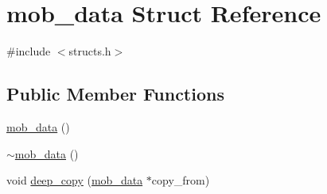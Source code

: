 \hypertarget{structmob__data}{\section{mob\-\_\-data Struct Reference}
\label{structmob__data}
}


{\ttfamily \#include $<$structs.\-h$>$}

\subsection*{Public Member Functions}
\begin{DoxyCompactItemize}
\item 
\hyperlink{structmob__data_afbc05dbae1398c3471a819f06c4aa904}{mob\-\_\-data} ()
\item 
\hyperlink{structmob__data_adc9bfc8556c0477389c0ec9a1e579055}{$\sim$mob\-\_\-data} ()
\item 
void \hyperlink{structmob__data_a9ba0ac10d57af36a05154c62fe3d5312}{deep\-\_\-copy} (\hyperlink{structmob__data}{mob\-\_\-data} $\ast$copy\-\_\-from)
\end{DoxyCompactItemize}
